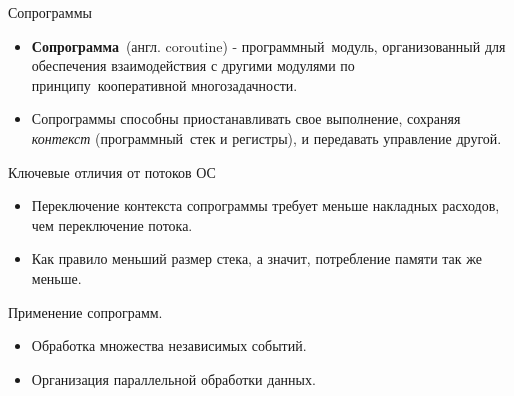 
{
\begin{frame}[noframenumbering]
		\titlepage
\end{frame}
}

\begin{frame}{Сопрограммы}
	\begin{itemize}
		\item \textbf{Сопрограмма} (англ. coroutine) - программный модуль, организованный для обеспечения взаимодействия с другими модулями по принципу кооперативной многозадачности.
		
		\item Сопрограммы способны приостанавливать свое выполнение, сохраняя \textit{контекст} 
		(программный стек и регистры), и передавать управление другой.
	\end{itemize}
\end{frame}
	
\begin{frame}{Ключевые отличия от потоков ОС}
	\begin{itemize}
		\item Переключение контекста сопрограммы требует меньше накладных расходов, чем переключение потока.
		\item Как правило меньший размер стека, а значит, потребление памяти так же меньше.
	\end{itemize}
\end{frame}

\begin{frame}{Применение сопрограмм.}
	\begin{itemize}
		\item Обработка множества независимых событий.
		\item Организация параллельной обработки данных.
	\end{itemize}
\end{frame}


